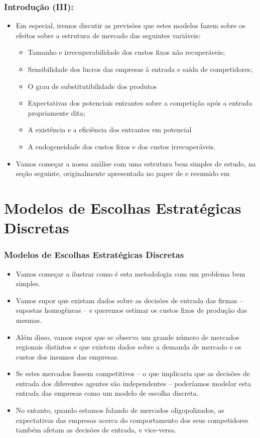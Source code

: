 \documentclass{beamer}
\begin{document}
\begin{frame}\frametitle{Introdução (III):}
\small
\begin{itemize}
\item Em especial, iremos discutir as previsões que estes modelos fazem
sobre os efeitos sobre a estrutura de mercado das seguintes variáveis:

\begin{itemize}
\item Tamanho e irrecuperabilidade dos custos fixos não recuperáveis;
\item Sensibilidade dos lucros das empresas à entrada e saída de competidores;
\item O grau de substitutibilidade dos produtos
\item Expectativas dos potenciais entrantes sobre a competição após a entrada
propriamente dita;
\item A existência e a eficiência dos entrantes em potencial
\item A endogeneidade dos custos fixos e dos custos irrecuperáveis.
\end{itemize}
\item Vamos começar a nossa análise com uma estrutura bem simples de estudo,
na seção seguinte, originalmente apresentada no paper de \citet{Bresnahan1991} e resumido em \citet{Berry2007a}
\end{itemize}
\end{frame}

\section{Modelos de Escolhas Estratégicas Discretas}
\begin{frame}\frametitle{Modelos de Escolhas Estratégicas Discretas}
\small
\begin{itemize}
\item Vamos começar a ilustrar como é esta metodologia com um problema bem
simples. 
\item Vamos supor que existam dados sobre as decisões de entrada das firmas
-- supostas homogêneas -- e queremos estimar
os custos fixos de produção das mesmas. 
\item Além disso, vamos supor que se observa um grande número de mercados
regionais distintos e que existem dados sobre a demanda de mercado
e os custos dos insumos das empresas. 
\item Se estes mercados fossem competitivos -- o que implicaria
que as decisões de entrada dos diferentes agentes são independentes
-- poderíamos modelar esta entrada das empresas como um
modelo de escolha discreta. 
\item No entanto, quando estamos falando de mercados oligopolizados, as
expectativas das empresas acerca do comportamento dos seus competidores
também afetam as decisões de entrada, e vice-versa. 
\end{itemize}
\end{frame}
\end{document}
